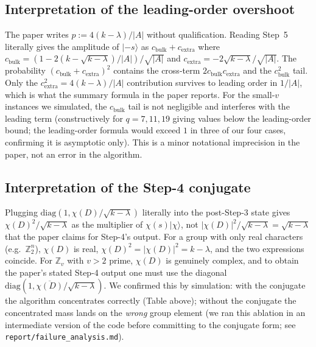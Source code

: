 \documentclass[11pt]{article}
\begin{document}
\subsection{Interpretation of the leading-order overshoot}
The paper writes $p := 4(k-\lambda)/|A|$ without qualification.  Reading
Step~5 literally gives the amplitude of $|-s\rangle$ as
$c_{\text{bulk}} + c_{\text{extra}}$ where
$c_{\text{bulk}} = (1-2(k-\sqrt{k-\lambda})/|A|)/\sqrt{|A|}$
and $c_{\text{extra}} = -2\sqrt{k-\lambda}/\sqrt{|A|}$.
The probability $(c_{\text{bulk}}+c_{\text{extra}})^2$ contains the
cross-term $2 c_{\text{bulk}} c_{\text{extra}}$ and the $c_{\text{bulk}}^2$
tail.  Only the $c_{\text{extra}}^2 = 4(k-\lambda)/|A|$ contribution
survives to leading order in $1/|A|$, which is what the summary formula
in the paper reports.  For the small-$v$ instances we simulated, the
$c_{\text{bulk}}$ tail is not negligible and interferes with the leading
term (constructively for $q=7,11,19$ giving values below the
leading-order bound; the leading-order formula would exceed $1$ in three
of our four cases, confirming it is asymptotic only).  This is a minor
notational imprecision in the paper, not an error in the algorithm.

\subsection{Interpretation of the Step-4 conjugate}
Plugging $\mathrm{diag}(1,\chi(D)/\sqrt{k-\lambda})$ literally into the
post-Step-3 state gives
$\chi(D)^2/\sqrt{k-\lambda}$ as the multiplier of $\chi(s)|\chi\rangle$,
not $|\chi(D)|^2/\sqrt{k-\lambda} = \sqrt{k-\lambda}$ that the paper
claims for Step-4's output.  For a group with only real characters
(e.g.\ $\mathbb{Z}_2^n$), $\chi(D)$ is real, $\chi(D)^2 = |\chi(D)|^2 =
k-\lambda$, and the two expressions coincide.  For $\mathbb{Z}_v$
with $v>2$ prime, $\chi(D)$ is genuinely complex, and to obtain the
paper's stated Step-4 output one must use the diagonal
$\mathrm{diag}(1, \overline{\chi(D)}/\sqrt{k-\lambda})$.  We confirmed
this by simulation: with the conjugate the algorithm concentrates
correctly (Table above); without the conjugate the concentrated mass
lands on the \emph{wrong} group element (we ran this ablation in an
intermediate version of the code before committing to the conjugate
form; see \texttt{report/failure\_analysis.md}).
\end{document}
